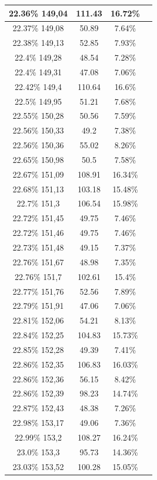 \begin{center}
\begin{longtable}{|c|c|c|c|}
22.36\% 149,04 & 111.43 & 16.72\%  \\ \hline
22.37\% 149,08 & 50.89 & 7.64\%  \\ \hline
22.38\% 149,13 & 52.85 & 7.93\%  \\ \hline
22.4\% 149,28 & 48.54 & 7.28\%  \\ \hline
22.4\% 149,31 & 47.08 & 7.06\%  \\ \hline
22.42\% 149,4 & 110.64 & 16.6\%  \\ \hline
22.5\% 149,95 & 51.21 & 7.68\%  \\ \hline
22.55\% 150,28 & 50.56 & 7.59\%  \\ \hline
22.56\% 150,33 & 49.2 & 7.38\%  \\ \hline
22.56\% 150,36 & 55.02 & 8.26\%  \\ \hline
22.65\% 150,98 & 50.5 & 7.58\%  \\ \hline
22.67\% 151,09 & 108.91 & 16.34\%  \\ \hline
22.68\% 151,13 & 103.18 & 15.48\%  \\ \hline
22.7\% 151,3 & 106.54 & 15.98\%  \\ \hline
22.72\% 151,45 & 49.75 & 7.46\%  \\ \hline
22.72\% 151,46 & 49.75 & 7.46\%  \\ \hline
22.73\% 151,48 & 49.15 & 7.37\%  \\ \hline
22.76\% 151,67 & 48.98 & 7.35\%  \\ \hline
22.76\% 151,7 & 102.61 & 15.4\%  \\ \hline
22.77\% 151,76 & 52.56 & 7.89\%  \\ \hline
22.79\% 151,91 & 47.06 & 7.06\%  \\ \hline
22.81\% 152,06 & 54.21 & 8.13\%  \\ \hline
22.84\% 152,25 & 104.83 & 15.73\%  \\ \hline
22.85\% 152,28 & 49.39 & 7.41\%  \\ \hline
22.86\% 152,35 & 106.83 & 16.03\%  \\ \hline
22.86\% 152,36 & 56.15 & 8.42\%  \\ \hline
22.86\% 152,39 & 98.23 & 14.74\%  \\ \hline
22.87\% 152,43 & 48.38 & 7.26\%  \\ \hline
22.98\% 153,17 & 49.06 & 7.36\%  \\ \hline
22.99\% 153,2 & 108.27 & 16.24\%  \\ \hline
23.0\% 153,3 & 95.73 & 14.36\%  \\ \hline
23.03\% 153,52 & 100.28 & 15.05\%  \\ \hline

\end{longtable}
\end{center}
